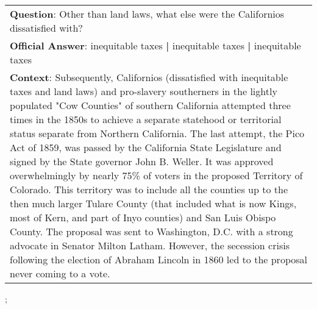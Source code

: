 \begin{figure*}[ht]
{\begin{tabular}{p{}}
            \textbf{Question}: Other than land laws, what else were the Californios dissatisfied with?                                                                                                                                                                                                                                                                                                                                                                                                                                                                                                                                                                                                                                                                                                                                                                                                                                                                                          \\
            \textbf{Official Answer}: inequitable taxes \textbf{|} inequitable taxes \textbf{|} inequitable taxes                                                                                                                                                                                                                                                                                                                                                                                                                                                                                                                                                                                                                                                                                                                                                                                                                                                                               \\
            \textbf{Context}: Subsequently, Californios (dissatisfied with inequitable taxes and land laws) and pro-slavery southerners in the lightly populated "Cow Counties" of southern California attempted three times in the 1850s to achieve a separate statehood or territorial status separate from Northern California. The last attempt, the Pico Act of 1859, was passed by the California State Legislature and signed by the State governor John B. Weller. It was approved overwhelmingly by nearly 75\% of voters in the proposed Territory of Colorado. This territory was to include all the counties up to the then much larger Tulare County (that included what is now Kings, most of Kern, and part of Inyo counties) and San Luis Obispo County. The proposal was sent to Washington, D.C. with a strong advocate in Senator Milton Latham. However, the secession crisis following the election of Abraham Lincoln in 1860 led to the proposal never coming to a vote. \\
        \end{tabular}
    };
    \label{fig:ex-5705f09e75f01819005e77a4}
\end{figure*}

